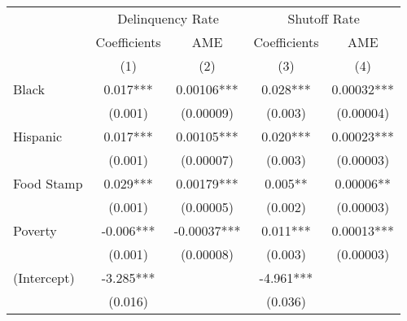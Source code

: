 \begin{tabular}{lcccc}
\toprule 
\midrule 
 & \multicolumn{2}{c}{Delinquency Rate} & \multicolumn{2}{c}{Shutoff Rate} \\
 \cmidrule(lr){2-3} \cmidrule(lr){4-5} 
 & Coefficients & AME & Coefficients & AME \\
 & (1) & (2) & (3) & (4) \\
\midrule 
Black & 0.017*** & 0.00106*** & 0.028*** & 0.00032*** \\
 & (0.001) & (0.00009) & (0.003) & (0.00004) \\
Hispanic & 0.017*** & 0.00105*** & 0.020*** & 0.00023*** \\
 & (0.001) & (0.00007) & (0.003) & (0.00003) \\
Food Stamp & 0.029*** & 0.00179*** & 0.005** & 0.00006** \\
 & (0.001) & (0.00005) & (0.002) & (0.00003) \\
Poverty & -0.006*** & -0.00037*** & 0.011*** & 0.00013*** \\
 & (0.001) & (0.00008) & (0.003) & (0.00003) \\
(Intercept) & -3.285*** &  & -4.961*** &  \\
 & (0.016) &  & (0.036) &  \\
\midrule 
\bottomrule 
\end{tabular}
